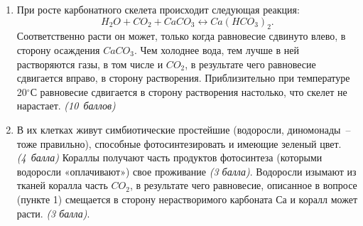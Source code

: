 \solutionSection
\begin{enumerate}
\item При росте карбонатного скелета происходит следующая реакция:
$$H_2O+CO_2+CaCO_3 \leftrightarrow Ca(HCO_3)_2.$$ Соответственно расти он может, только когда 
равновесие сдвинуто влево, в сторону осаждения $CaCO_3$. Чем холоднее вода, тем лучше в ней растворяются газы, 
в том числе и $CO_2$, в результате чего равновесие сдвигается вправо, в сторону растворения. Приблизительно 
при температуре 20$^{\circ}$С равновесие сдвигается в сторону растворения настолько, что скелет не 
нарастает. \textit{(10~баллов)}
\item В их клетках живут симбиотические простейшие (водоросли, диномонады~– тоже правильно), способные 
фотосинтезировать и имеющие зеленый цвет. \textit{(4~балла)} Кораллы получают часть продуктов фотосинтеза (которыми водоросли «оплачивают») свое проживание \textit{(3 балла)}. Водоросли изымают из тканей коралла часть $CO_2$, в результате чего равновесие, описанное в вопросе (пункте 1) смещается в сторону нерастворимого карбоната $Са$ и коралл может расти. \textit{(3 балла)}.
\end{enumerate}
